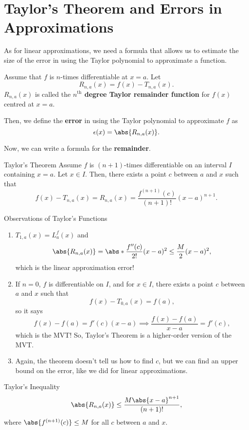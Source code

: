 \section{Taylor's Theorem and Errors in Approximations}
As for linear approximations, we need a formula that allows us to estimate the size of the error
in using the Taylor polynomial to approximate a function.
\begin{Definition}{}{}
    Assume that $ f $ is $ n $-times differentiable at $ x=a $. Let
    \[ R_{n,a}(x)=f(x)-T_{n,a}(x). \]
    $ R_{n,a}(x) $ is called the \textbf{$n^{\text{th}}$ degree Taylor remainder function} for $ f(x) $ centred at $ x=a $.

    Then, we define the \textbf{error} in using the Taylor polynomial to approximate $ f $ as
    \[ \epsilon(x)=\abs{R_{n,a}(x)}. \]
\end{Definition}
Now, we can write a formula for the \textbf{remainder}.
\begin{Theorem}{Taylor's Theorem}{}
    Assume $ f $ is $ (n+1) $-times differentiable on an interval $ I $ containing $ x=a $. Let $ x\in I $. Then, there exists
    a point $c$ between $a$ and $x$ such that
    \[ f(x)-T_{n,a}(x)=R_{n,a}(x)=\frac{f^{(n+1)}(c)}{(n+1)!}(x-a)^{n+1}. \]
\end{Theorem}
\begin{Remark}{Observations of Taylor's Functions}{}
    \begin{enumerate}[(1)]
        \item $ T_{1,a}(x)=L_a^f(x) $ and
              \[ \abs{R_{n,a}(x)}=\abs*{\frac{f''(c)}{2!}}(x-a)^2\le \frac{M}{2}(x-a)^2, \]
              which is the linear approximation error!
        \item If $ n=0 $, $ f $ is differentiable on $ I $, and for $ x\in I $, there exists a point $c$ between $a$ and $x$ such that
              \[ f(x)-T_{0,a}(x)=f(a), \]
              so it says
              \[ f(x)-f(a)=f'(c)(x-a)\implies \frac{f(x)-f(a)}{x-a}=f'(c), \]
              which is the MVT\@! So, Taylor's Theorem is a higher-order version of the MVT\@.
        \item Again, the theorem doesn't tell us how to find $ c $, but we can find an upper bound on the error,
              like we did for linear approximations.
    \end{enumerate}
\end{Remark}
\begin{Theorem}{Taylor's Inequality}{}
    \[ \abs{R_{n,a}(x)}\le \frac{M\abs{x-a}^{n+1}}{(n+1)!}, \]
    where $ \abs{f^{(n+1)}(c)}\le M $ for all $c$ between $a$ and $x$.
\end{Theorem}
